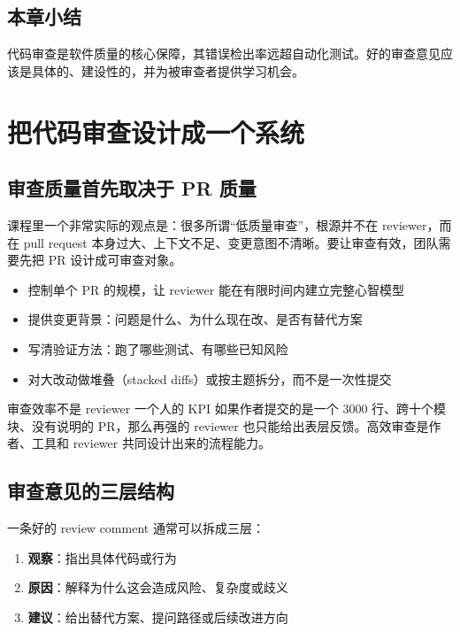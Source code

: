 \documentclass[a4paper]{article}
\begin{document}
\subsection{本章小结}

代码审查是软件质量的核心保障，其错误检出率远超自动化测试。好的审查意见应该是具体的、建设性的，并为被审查者提供学习机会。

\section{把代码审查设计成一个系统}

\subsection{审查质量首先取决于 PR 质量}

课程里一个非常实际的观点是：很多所谓``低质量审查''，根源并不在 reviewer，而在 pull request 本身过大、上下文不足、变更意图不清晰。要让审查有效，团队需要先把 PR 设计成可审查对象。

\begin{itemize}
    \item 控制单个 PR 的规模，让 reviewer 能在有限时间内建立完整心智模型
    \item 提供变更背景：问题是什么、为什么现在改、是否有替代方案
    \item 写清验证方法：跑了哪些测试、有哪些已知风险
    \item 对大改动做堆叠（stacked diffs）或按主题拆分，而不是一次性提交
\end{itemize}

\begin{importantbox}{审查效率不是 reviewer 一个人的 KPI}
如果作者提交的是一个 3000 行、跨十个模块、没有说明的 PR，那么再强的 reviewer 也只能给出表层反馈。高效审查是作者、工具和 reviewer 共同设计出来的流程能力。
\end{importantbox}

\subsection{审查意见的三层结构}

一条好的 review comment 通常可以拆成三层：

\begin{enumerate}
    \item \textbf{观察}：指出具体代码或行为
    \item \textbf{原因}：解释为什么这会造成风险、复杂度或歧义
    \item \textbf{建议}：给出替代方案、提问路径或后续改进方向
\end{enumerate}
\end{document}
